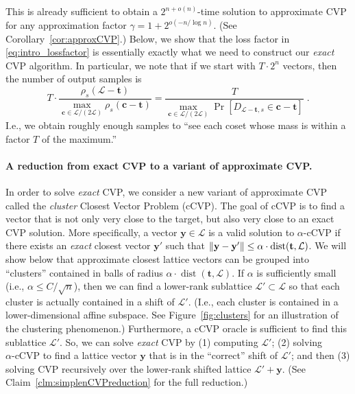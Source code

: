 \documentclass[11pt]{article}
\renewcommand{\vec}[1]{\ensuremath{\mathbf{#1}}}
\newcommand{\problem}[1]{\mbox{#1}\xspace}
\newcommand{\scarequotes}[1]{``#1''}
\newcommand{\lat}{\mathcal{L}}
\DeclareMathOperator{\dist}{dist}
\DeclarePairedDelimiter\length{\lVert}{\rVert}
\begin{document}
This is already sufficient to obtain a $2^{n+o(n)}$-time solution to approximate \problem{CVP} for any approximation factor $\gamma = 1+2^{o(-n/\log n)}$. (See Corollary~\ref{cor:approxCVP}.) Below, we show that the loss factor in \eqref{eq:intro_lossfactor} is essentially exactly what we need to construct our \emph{exact} CVP algorithm. In particular, we note that if we start with $T \cdot 2^n$ vectors, then the number of output samples is 
\begin{equation}
\label{eq:intro_lossfactor2}
T \cdot \frac{\rho_s(\lat - \vec{t})}{\max_{\vec{c} \in \lat/(2\lat)} \rho_s(\vec{c} - \vec{t})} = \frac{T}{\max_{\vec{c} \in \lat/(2\lat)}\Pr[D_{\lat - \vec{t}, s} \in \vec{c} - \vec{t}]}
\; .
\end{equation}
I.e., we obtain roughly enough samples to \scarequotes{see each coset whose mass is within a factor $T$ of the maximum.}


\paragraph{A reduction from exact CVP to a variant of approximate CVP. } 
In order to solve \emph{exact} CVP, we consider a new variant of approximate CVP called the \emph{cluster} Closest Vector Problem (cCVP). The goal of cCVP is to find a vector that is not only very close to the target, but also very close to an exact CVP solution. More specifically, a vector $\vec{y} \in \lat$ is a valid solution to $\alpha\text{-}\problem{cCVP}$ if there exists an \emph{exact} closest vector $\vec{y}'$ such that $\length{\vec{y} - \vec{y}'} \leq \alpha \cdot \dist(\vec{t}, \lat)$.  We will show below that approximate closest lattice vectors can be grouped into \scarequotes{clusters} contained in balls of radius $\alpha \cdot \dist(\vec{t}, \lat)$. If $\alpha$ is sufficiently small (i.e., $\alpha \leq C/\sqrt{n}$), then we can find a lower-rank sublattice $\lat' \subset \lat$ so that each cluster is actually contained in a shift of $\lat'$. (I.e., each cluster is contained in a lower-dimensional affine subspace. See Figure~\ref{fig:clusters} for an illustration of the clustering phenomenon.) Furthermore, a cCVP oracle is sufficient to find this sublattice $\lat'$. So, we can solve \emph{exact} CVP by (1) computing $\lat'$; (2) solving $\alpha\text{-}\problem{cCVP}$ to find a lattice vector $\vec{y}$ that is in the \scarequotes{correct} shift of $\lat'$; and then (3) solving CVP recursively over the lower-rank shifted lattice $\lat' + \vec{y}$. (See Claim~\ref{clm:simplenCVPreduction} for the full reduction.)
\end{document}

